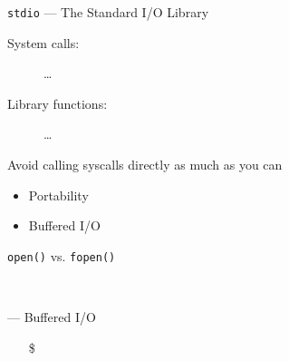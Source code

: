 \begin{frame}{\texttt{stdio} --- The Standard I/O Library}
  \begin{description}
  \item[System calls:] \ldots
  \item[Library functions:] \ldots
  \end{description}
  \begin{block}{Avoid calling syscalls directly as much as you can}
    \begin{minipage}{.4\linewidth}
      \begin{itemize}
      \item Portability
      \item Buffered I/O
      \end{itemize}
    \end{minipage}\qquad
    \begin{minipage}{.4\linewidth}
      \begin{center}
      \end{center}
    \end{minipage}
  \end{block}  
\end{frame}

\begin{frame}{\texttt{open()} {\scriptsize vs.} \texttt{fopen()}}
  \begin{center}
    \begin{minipage}{.48\linewidth}
      \\[1ex]
    \end{minipage}\quad
    \begin{minipage}{.48\linewidth}
       --- Buffered I/O\\[1ex]
    \end{minipage}
  \end{center}{\footnotesize
  \begin{itemize}
  \item[\$] 
  \end{itemize}}
\end{frame}

